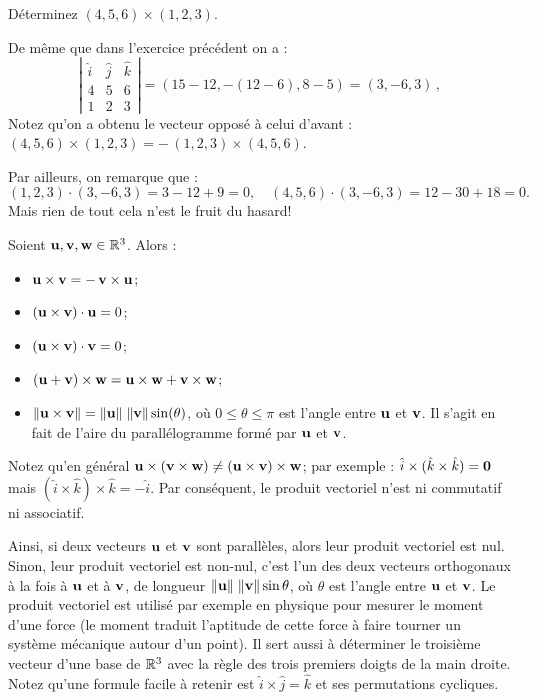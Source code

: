 \begin{myprob} Déterminez $(4,5,6)\times(1,2,3)$.

\begin{mysol} De même que dans l'exercice précédent on a :
$$
\left| \begin{matrix}
\hat{i} & \hat{j} & \hat{k} \\
4 & 5 & 6\\
1 & 2 & 3 \end{matrix} \right|
= (15-12, -(12-6), 8-5) = (3,-6,3)\,,
$$
Notez qu'on a obtenu le vecteur opposé à celui d'avant :  $(4,5,6)\times(1,2,3) = -\,(1,2,3)\times(4,5,6)$. 
\end{mysol}\end{myprob}

Par ailleurs, on remarque que :
$$
(1,2,3)\cdot (3,-6,3) = 3-12+9 = 0, \quad (4,5,6)\cdot (3,-6,3) = 12-30+18=0.
$$
Mais rien de tout cela n'est le fruit du hasard!

\begin{theorem}    \label{theoreme : proprietes du produit vectoriel}
Soient $\mathbf{u},\mathbf{v},\mathbf{w}\in \mathbb{R}^3$.  Alors :
\begin{itemize}
\item $\mathbf{u} \times \mathbf{v} = -\,\mathbf{v} \times \mathbf{u}$;
\item $(\mathbf{u} \times \mathbf{v})\cdot \mathbf{u} = 0$;
\item $(\mathbf{u} \times \mathbf{v})\cdot \mathbf{v} = 0$;
\item $(\mathbf{u} + \mathbf{v})\times \mathbf{w} = \mathbf{u} \times \mathbf{w} + \mathbf{v} \times \mathbf{w}$;
\item $\Vert \mathbf{u} \times \mathbf{v} \Vert = \Vert \mathbf{u} \Vert \; \Vert \mathbf{v} \Vert \sin(\theta)$, où $0 \leq \theta \leq \pi$ est l'angle entre $\mathbf{u}$ et $\mathbf{v}$.
Il s'agit en fait de l'aire du parallélogramme formé par $\mathbf{u}$ et $\mathbf{v}$.
\end{itemize}
Notez qu'en général $\mathbf{u} \times (\mathbf{v} \times \mathbf{w}) \neq (\mathbf{u} \times \mathbf{v}) \times \mathbf{w}$; par exemple : $\hat{i} \times (\hat{k} \times \hat{k}) = \mathbf{0}$ mais $(\hat{i} \times \hat{k})\times \hat{k} = -\hat{i}$. Par conséquent, 
le produit vectoriel n'est ni commutatif ni associatif. 
\end{theorem}


Ainsi, si deux vecteurs $\mathbf{u}$ et $\mathbf{v}$ sont parallèles, alors leur produit vectoriel
est nul.  Sinon, leur produit vectoriel est non-nul, c'est l'un des deux vecteurs orthogonaux à la fois à 
$\mathbf{u}$ et à $\mathbf{v}$, de longueur $\Vert \mathbf{u} \Vert \; \Vert \mathbf{v} \Vert \sin\theta$, où $\theta$ est l'angle entre $\mathbf{u}$ et $\mathbf{v}$.
Le produit vectoriel est utilisé par exemple en physique pour mesurer le moment d'une force (le moment traduit l'aptitude de cette force à faire tourner un système mécanique autour d'un point). Il sert aussi à déterminer le troisième vecteur d'une base de $\mathbb{R}^3$ avec la règle des trois premiers doigts de la main droite. Notez qu'une formule facile à retenir est $\hat{i} \times \hat{j} = \hat{k}$ et ses permutations cycliques.

